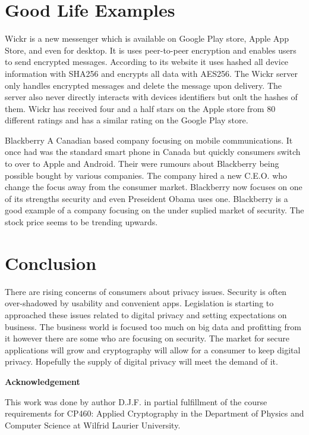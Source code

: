 \documentclass[12pt]{article}
\begin{document}
\section{Good Life Examples}\label{sec:real-life}
Wickr is a new messenger which is available on Google Play store, Apple App Store, and even for desktop. It is uses peer-to-peer encryption and enables users to send encrypted messages.  According to its website it uses hashed all device information with SHA256 and encrypts all data with AES256. The Wickr server only handles encrypted messages and delete the message upon delivery. The server also never directly interacts with devices identifiers but onlt the hashes of them. Wickr has received four and a half stars on the Apple store from 80 different ratings and has a similar rating on the Google Play store. 

Blackberry
A Canadian based company focusing on mobile communications. It once had was the standard smart phone in Canada but quickly consumers switch to over to Apple and Android. Their were rumours about Blackberry being possible bought by various companies. The company hired a new C.E.O. who change the focus away from the consumer market. Blackberry now focuses on one of its strengths security and even Preseident Obama uses one.\cite{Marks} Blackberry is a good example of a company focusing on the under suplied market of security. The stock price seems to be trending upwards.


\section{Conclusion}\label{sec:conclusion}
There are rising concerns of consumers about privacy issues. Security is often over-shadowed by usability and convenient apps. Legislation is starting to approached these issues related to digital privacy and setting expectations on business. The business world is focused too much on big data and profitting from it however there are some who are focusing on security. The market for secure applications will grow and cryptography will allow for a consumer to keep digital privacy. Hopefully the supply of digital privacy will meet the demand of it.

\begin{center}
{\bf Acknowledgement}
\end{center}
This work was done by author D.J.F. in partial fulfillment of the course requirements for CP460: Applied Cryptography in the Department of Physics and Computer Science at Wilfrid Laurier University.
\end{document}
